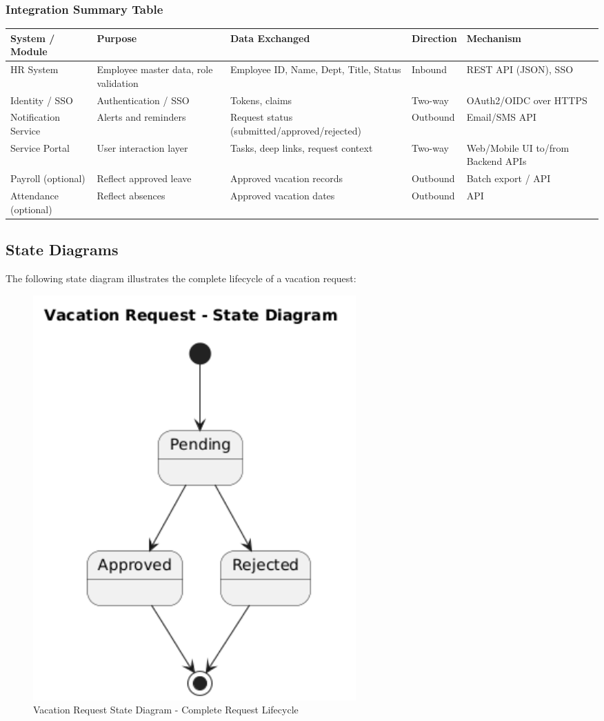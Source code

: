 \documentclass[12pt,a4paper]{article}
\begin{document}
\subsubsection*{Integration Summary Table}
\begin{longtable}{p{3.2cm} p{4.2cm} p{4.2cm} p{2.1cm} p{2.1cm}}
\toprule
\textbf{System / Module} & \textbf{Purpose} & \textbf{Data Exchanged} & \textbf{Direction} & \textbf{Mechanism} \\
\midrule
HR System & Employee master data, role validation & Employee ID, Name, Dept, Title, Status & Inbound & REST API (JSON), SSO \\
Identity / SSO & Authentication / SSO & Tokens, claims & Two-way & OAuth2/OIDC over HTTPS \\
Notification Service & Alerts and reminders & Request status (submitted/approved/rejected) & Outbound & Email/SMS API \\
Service Portal & User interaction layer & Tasks, deep links, request context & Two-way & Web/Mobile UI to/from Backend APIs \\
Payroll (optional) & Reflect approved leave & Approved vacation records & Outbound & Batch export / API \\
Attendance (optional) & Reflect absences & Approved vacation dates & Outbound & API \\
\bottomrule
\end{longtable}

\subsection{State Diagrams}
The following state diagram illustrates the complete lifecycle of a vacation request:

\begin{figure}[H]
\centering
\includegraphics[width=0.6\textwidth]{Diagrams/State-Diagram/State-Diagram.png}
\caption{Vacation Request State Diagram - Complete Request Lifecycle}
\label{fig:state-diagram-app}
\end{figure}
\end{document}

